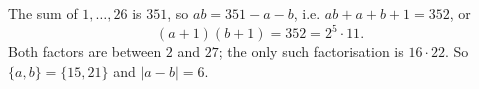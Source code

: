 The sum of $1,\dots,26$ is $351$, so $ab=351-a-b$, i.e. $ab+a+b+1=352$, or
\[(a+1)(b+1)=352=2^5\cdot11.\]
Both factors are between $2$ and $27$; the only such factorisation is $16\cdot22$. So $\{a,b\}=\{15,21\}$ and $|a-b|=\boxed{6}$.
